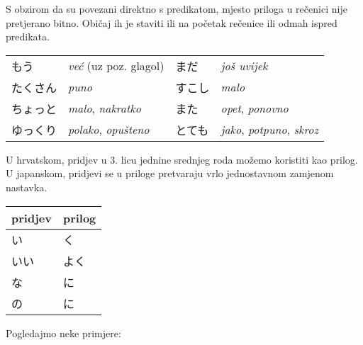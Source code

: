 	
	S obzirom da su povezani direktno s predikatom, mjesto priloga u rečenici nije pretjerano bitno. Običaj ih je staviti ili na početak rečenice ili odmah ispred predikata.
	
	\vspace{10pt}
	\begin{tabular}{l l l l}
		もう&\textit{već} (uz poz. glagol)&まだ&\textit{još uvijek}\\
		たくさん&\textit{puno}&すこし&\textit{malo}\\
		ちょっと&\textit{malo}, \textit{nakratko}&また&\textit{opet}, \textit{ponovno}\\
		ゆっくり&\textit{polako}, \textit{opušteno}&とても&\textit{jako}, \textit{potpuno}, \textit{skroz}\\
	\end{tabular}

	
	U hrvatskom, pridjev u 3. licu jednine srednjeg roda možemo koristiti kao prilog. U japanskom, pridjevi se u priloge pretvaraju vrlo jednostavnom zamjenom nastavka.
	
	\begin{table}[h]
		\centering
		\begin{tabular}{l l}\toprule[2pt]
			pridjev&prilog\\
			\midrule
			い&く\\
			いい\footnotemark[1]&よく\\
			な&に\\
			の&に\\
			\bottomrule[2pt]
		\end{tabular}
	\end{table}


	Pogledajmo neke primjere:
	
	\begin{reibun}
	\end{reibun}

	

